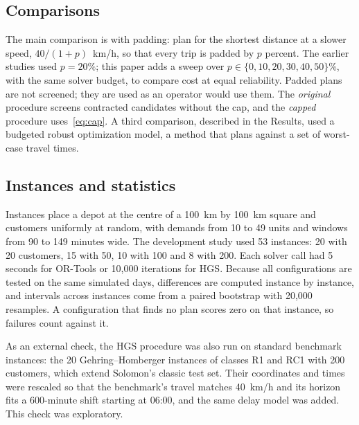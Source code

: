 \documentclass[12pt,letterpaper]{article}
\begin{document}
\subsection{Comparisons}

The main comparison is with padding: plan for the shortest distance at a slower
speed, $40/(1+p)$~km/h, so that every trip is padded by $p$ percent. The earlier
studies used $p=20\%$; this paper adds a sweep over $p\in\{0,10,20,30,40,50\}$\%,
with the same solver budget, to compare cost at equal reliability. Padded plans are
not screened; they are used as an operator would use them. The \emph{original}
procedure screens contracted candidates without the cap, and the \emph{capped}
procedure uses~\eqref{eq:cap}. A third comparison, described in the
Results, used a budgeted robust optimization model\cite{bertsimas2004,agra2013}, a
method that plans against a set of worst-case travel times.

\subsection{Instances and statistics}

Instances place a depot at the centre of a 100~km by 100~km square and customers
uniformly at random, with demands from 10 to 49 units and windows from 90 to 149
minutes wide. The development study used 53 instances: 20 with 20 customers, 15
with 50, 10 with 100 and 8 with 200. Each solver call had 5 seconds for OR-Tools or
10,000 iterations for HGS. Because all configurations are tested on the same
simulated days, differences are computed instance by instance, and intervals across
instances come from a paired bootstrap with 20,000 resamples. A configuration that
finds no plan scores zero on that instance, so failures count against it.

As an external check, the HGS procedure was also run on standard benchmark
instances: the 20 Gehring--Homberger instances of classes R1 and RC1 with 200
customers\cite{gehring1999}, which extend Solomon's classic test
set\cite{solomon1987}. Their coordinates and times were rescaled so that the
benchmark's travel matches 40~km/h and its horizon fits a 600-minute shift
starting at 06:00, and the same delay model was added. This check was exploratory.
\end{document}
